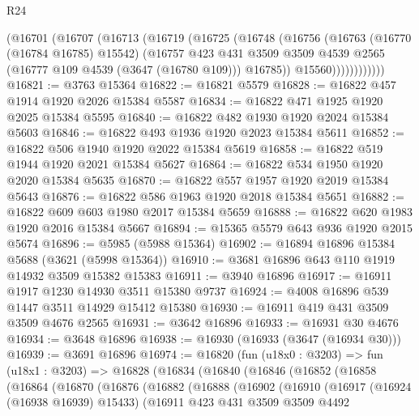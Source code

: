 \begin{lexlean}{R24}
\begin{coremodule}
              (@16701
                (@16707
                  (@16713
                    (@16719
                      (@16725
                        (@16748
                          (@16756
                            (@16763
                              (@16770 (@16784 @16785) @15542)
                              (@16757
                                @423
                                @431
                                @3509
                                @3509
                                @4539
                                @2565
                                (@16777 @109 @4539 (@3647 (@16780 @109)))
                                @16785))
                            @15560))))))))))))
@16821 := @3763 @15364
@16822 := @16821 @5579
@16828 := @16822 @457 @1914 @1920 @2026 @15384 @5587
@16834 := @16822 @471 @1925 @1920 @2025 @15384 @5595
@16840 := @16822 @482 @1930 @1920 @2024 @15384 @5603
@16846 := @16822 @493 @1936 @1920 @2023 @15384 @5611
@16852 := @16822 @506 @1940 @1920 @2022 @15384 @5619
@16858 := @16822 @519 @1944 @1920 @2021 @15384 @5627
@16864 := @16822 @534 @1950 @1920 @2020 @15384 @5635
@16870 := @16822 @557 @1957 @1920 @2019 @15384 @5643
@16876 := @16822 @586 @1963 @1920 @2018 @15384 @5651
@16882 := @16822 @609 @603 @1980 @2017 @15384 @5659
@16888 := @16822 @620 @1983 @1920 @2016 @15384 @5667
@16894 := @15365 @5579 @643 @936 @1920 @2015 @5674
@16896 := @5985 (@5988 @15364)
@16902 := @16894 @16896 @15384 @5688 (@3621 (@5998 @15364))
@16910 := @3681 @16896 @643 @110 @1919 @14932 @3509 @15382 @15383
@16911 := @3940 @16896
@16917 := @16911 @1917 @1230 @14930 @3511 @15380 @9737
@16924 := @4008 @16896 @539 @1447 @3511 @14929 @15412 @15380
@16930 := @16911 @419 @431 @3509 @3509 @4676 @2565
@16931 := @3642 @16896
@16933 := @16931 @30 @4676
@16934 := @3648 @16896
@16938 := @16930 (@16933 (@3647 (@16934 @30)))
@16939 := @3691 @16896
@16974 := @16820
    (fun (u18x0 : @3203) =>
    fun (u18x1 : @3203) =>
    @16828
      (@16834
        (@16840
          (@16846
            (@16852
              (@16858
                (@16864
                  (@16870
                    (@16876
                      (@16882
                        (@16888
                          (@16902
                            (@16910
                              (@16917
                                (@16924 (@16938 @16939) @15433)
                                (@16911
                                  @423
                                  @431
                                  @3509
                                  @3509
                                  @4492

\end{coremodule}
\end{lexlean}
